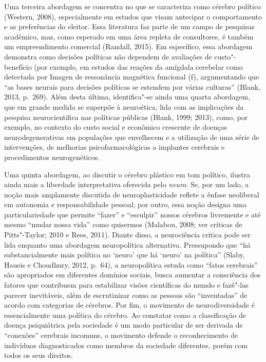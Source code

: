 Uma terceira abordagem se concentra no que se caracteriza como cérebro
político (Western, 2008), especialmente em estudos que visam antecipar o
comportamento e as preferências do eleitor. Essa literatura faz parte de
um campo de pesquisas acadêmico, mas, como esperado em uma área repleta
de consultores, é também um empreendimento comercial (Randall, 2015). Em
específico, essa abordagem demonstra como decisões políticas não
dependem de avaliações de custo"-benefício (por exemplo, em estudos das
reações da amígdala cerebelar como detectada por Imagen de ressonância
magnética funcional (f), argumentando que ``as bases neurais para
decisões políticas se estendem por várias culturas'' (Blank, 2013,
p.~269). Além desta última, identifica"-se ainda uma quarta abordagem, que
em grande medida se superpõe à neuroética, lida com as implicações da
pesquisa neurocientífica nas políticas públicas (Blank, 1999; 2013),
como, por exemplo, no contexto do custo social e econômico crescente de
doenças neurodegenerativas em populações que envelhecem e a utilização
de uma série de intervenções, de melhorias psicofarmacológicas a
implantes cerebrais e procedimentos neurogenéticos.

Uma quinta abordagem, ao discutir o cérebro plástico em tom político,
ilustra ainda mais a liberdade interpretativa oferecida pelo
\emph{neuro}. Se, por um lado, a noção mais amplamente discutida de
neuroplasticidade reflete a ênfase neoliberal em autonomia e
responsabilidade pessoal; por outro, essa noção designa uma
particulariedade que permite ``fazer'' e ``esculpir'' nossos cérebros
livremente e até mesmo ``mudar nossa vida'' como quisermos (Malabou,
2008; ver críticas de Pitts"-Taylor; 2010 e Rees, 2011). Diante disso, a
neurociência critica pode ser lida enquanto uma abordagem neuropolítica
alternativa. Pressupondo que ``há substancialmente mais política no
`neuro' que há `neuro' na política'' (Slaby, Haueis e Choudhury, 2012,
p.~64), a neuropolítica estuda como ``fatos cerebrais'' são apropriados
em diferentes domínios sociais, busca aumentar a consciência dos fatores
que contribuem para estabilizar visões científicas do mundo e fazê"-las
parecer inevitáveis, além de escrutinizar como as pessoas são
``inventadas'' de acordo com categorias de cérebros. Por fim, o
movimento de neurodiversidade é essencialmente uma política do cérebro.
Ao constatar como a classificação de doença psiquiátrica pela sociedade
é um modo particular de ser derivada de ``conexões'' cerebrais incomuns,
o movimento defende o reconhecimento de indivíduos diagnosticados como
membros da sociedade diferentes, porém com todos os seus direitos.

